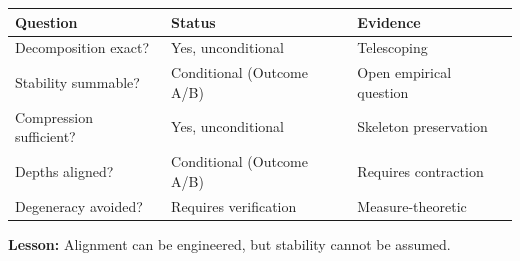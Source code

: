 \begin{center}\small
\begin{tabular}{lll}
\toprule
Question & Status & Evidence \\
\midrule
Decomposition exact? & Yes, unconditional & Telescoping \\
Stability summable? & Conditional (Outcome A/B) & Open empirical question \\
Compression sufficient? & Yes, unconditional & Skeleton preservation \\
Depths aligned? & Conditional (Outcome A/B) & Requires contraction \\
Degeneracy avoided? & Requires verification & Measure-theoretic \\
\bottomrule
\end{tabular}
\end{center}

\textbf{Lesson:} Alignment can be engineered, but stability cannot be assumed.
